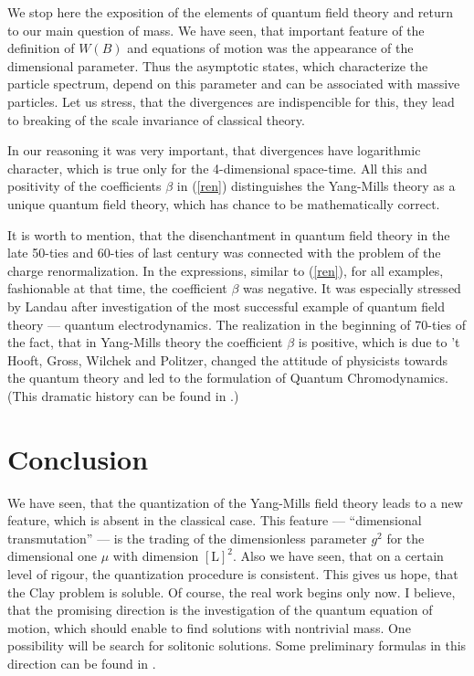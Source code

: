 \documentclass[12pt]{article}
\begin{document}
	We stop here the exposition of the elements of quantum field 
	theory and return to our main question of mass.
	We have seen, that important feature of the definition of
    $ W(B) $
	and equations of motion was the appearance of the
	dimensional parameter.
	Thus the asymptotic states, which characterize the particle 
	spectrum, depend on this parameter and can be associated
	with massive particles.
	Let us stress, that the divergences are
	indispencible for this,
	they lead to breaking of the scale invariance
	of classical theory.

	In our reasoning it was very important, that divergences have 
	logarithmic character, which is true only for the 4-dimensional 
	space-time.
	All this and positivity of the coefficients
    $ \beta $
	in
(\ref{ren})
	distinguishes the Yang-Mills theory as a unique quantum field
	theory, which has chance to be mathematically correct.

	It is worth to mention, that the disenchantment in quantum
	field theory in the late 50-ties and 60-ties of last century
	was connected with the problem of the charge renormalization.
	In the expressions, similar to
(\ref{ren}),
	for all examples, fashionable at that time, the coefficient
    $ \beta $
	was negative.
	It was especially stressed by Landau after investigation
	of the most successful example of quantum field theory ---
	quantum electrodynamics.
	The realization in the beginning of 70-ties of the fact,
	that in Yang-Mills theory the coefficient
    $ \beta $
	is positive, which is due to 't Hooft, Gross, Wilchek and Politzer,
	changed the attitude of physicists towards the quantum theory
	and led to the formulation of Quantum Chromodynamics.
	(This dramatic history can be found in
\cite{Gross}.)

\section*{Conclusion}
	We have seen, that the quantization of the Yang-Mills field 
	theory leads to a new feature, which is absent in the classical
	case.
	This feature ---
	``dimensional transmutation'' --- is the trading of the 
	dimensionless parameter
    $ g^{2} $
	for the dimensional one
    $ \mu $
	with dimension
    $ [\text{L}]^{2} $.
	Also we have seen, that on a certain level of rigour, 
	the quantization procedure is consistent.
	This gives us hope, that the Clay problem is soluble.
	Of course, the real work begins only now.
	I believe, that the promising direction is the investigation
	of the quantum equation of motion, which should enable to find
	solutions with nontrivial mass.
	One possibility will be search for solitonic solutions.
	Some preliminary formulas in this direction can be found in
\cite{FN}.
\end{document}
